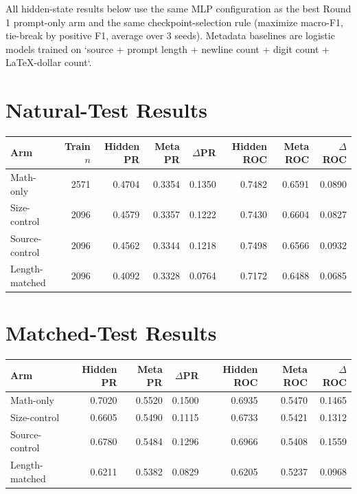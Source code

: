 \documentclass[11pt]{article}
\begin{document}
All hidden-state results below use the same MLP configuration as the best Round 1 prompt-only arm and the same checkpoint-selection rule (maximize macro-F1, tie-break by positive F1, average over 3 seeds). Metadata baselines are logistic models trained on `source + prompt length + newline count + digit count + LaTeX-dollar count`.

\section*{Natural-Test Results}
\begin{center}
\small
\setlength{\tabcolsep}{4pt}
\begin{tabular}{@{}p{2.5cm}rrrrrrr@{}}
\toprule
Arm & Train $n$ & Hidden PR & Meta PR & $\Delta$PR & Hidden ROC & Meta ROC & $\Delta$ROC \\
\midrule
Math-only & 2571 & 0.4704 & 0.3354 & 0.1350 & 0.7482 & 0.6591 & 0.0890 \\
Size-control & 2096 & 0.4579 & 0.3357 & 0.1222 & 0.7430 & 0.6604 & 0.0827 \\
Source-control & 2096 & 0.4562 & 0.3344 & 0.1218 & 0.7498 & 0.6566 & 0.0932 \\
Length-matched & 2096 & 0.4092 & 0.3328 & 0.0764 & 0.7172 & 0.6488 & 0.0685 \\
\bottomrule
\end{tabular}
\end{center}

\section*{Matched-Test Results}
\begin{center}
\small
\setlength{\tabcolsep}{4pt}
\begin{tabular}{@{}p{2.5cm}rrrrrr@{}}
\toprule
Arm & Hidden PR & Meta PR & $\Delta$PR & Hidden ROC & Meta ROC & $\Delta$ROC \\
\midrule
Math-only & 0.7020 & 0.5520 & 0.1500 & 0.6935 & 0.5470 & 0.1465 \\
Size-control & 0.6605 & 0.5490 & 0.1115 & 0.6733 & 0.5421 & 0.1312 \\
Source-control & 0.6780 & 0.5484 & 0.1296 & 0.6966 & 0.5408 & 0.1559 \\
Length-matched & 0.6211 & 0.5382 & 0.0829 & 0.6205 & 0.5237 & 0.0968 \\
\bottomrule
\end{tabular}
\end{center}
\end{document}
